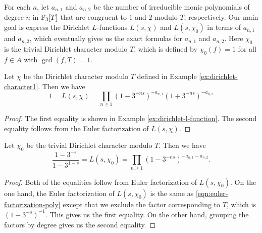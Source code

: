 For each $n$, let $a_{n,1}$ and $a_{n,2}$ be the number of irreducible monic polynomials of degree $n$ in $\mathbb{F}_3[T]$ that are congruent to $1$ and $2$ modulo $T$, respectively.
Our main goal is express the Dirichlet $L$-functions $L(s, \chi)$ and $L(s, \chi_0)$ in terms of $a_{n,1}$ and $a_{n,2}$, which eventually gives us the exact formulas for $a_{n,1}$ and $a_{n,2}$.
Here $\chi_0$ is the trivial Dirichlet character modulo $T$, which is defined by $\chi_0(f) = 1$ for all $f \in A$ with $\gcd(f, T) = 1$.
\begin{lemma}
    Let $\chi$ be the Dirichlet character modulo $T$ defined in Example \ref{ex:dirichlet-character1}.
    Then we have
    \begin{equation}
        1 = L(s, \chi) = \prod_{n \ge 1} (1 - 3^{-ns})^{-a_{n,1}} (1 + 3^{-ns})^{-a_{n,2}}
        \label{eqn:dirichlet-l-function-chi}
    \end{equation}
\end{lemma}
\begin{proof}
    The first equality is shown in Example \ref{ex:dirichlet-l-function}.
    The second equality follows from the Euler factorization of $L(s, \chi)$.
\end{proof}

\begin{lemma}
    Let $\chi_0$ be the trivial Dirichlet character modulo $T$.
    Then we have
    \begin{equation}
        \frac{1 - 3^{-s}}{1 - 3^{1 - s}} = L(s, \chi_0) = \prod_{n \ge 1} (1 - 3^{-ns})^{-a_{n,1} -a_{n,2}}.
        \label{eqn:dirichlet-l-function-chi0}
    \end{equation}
\end{lemma}
\begin{proof}
    Both of the equalities follow from Euler factorization of $L(s, \chi_0)$.
    On the one hand, the Euler factorization of $L(s, \chi_0)$ is the same as \eqref{eqn:euler-factorization-poly} except that we exclude the factor corresponding to $T$, which is $(1 - 3^{-s})^{-1}$. This gives us the first equality.
    On the other hand, grouping the factors by degree gives us the second equality.
\end{proof}

